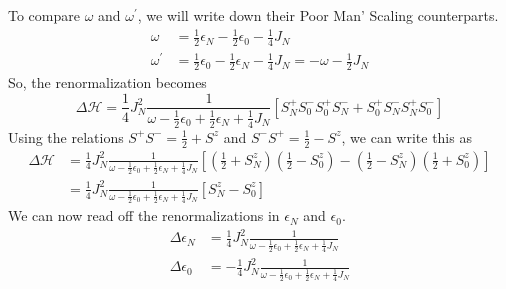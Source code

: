 \documentclass[twoside,11pt]{report}
\numberwithin{equation}{section}
\begin{document}
To compare \(\omega\) and \(\omega^\prime\), we will write down their Poor Man' Scaling counterparts.
\begin{equation}\begin{aligned}
	\omega &= \frac{1}{2}\epsilon_N - \frac{1}{2}\epsilon_0 - \frac{1}{4}J_N\\
	\omega^\prime &= \frac{1}{2}\epsilon_0 - \frac{1}{2}\epsilon_N - \frac{1}{4}J_N = -\omega - \frac{1}{2}J_N
\end{aligned}\end{equation}
So, the renormalization becomes
\begin{equation}
	\Delta \mathcal{H} = \frac{1}{4}J_N^2 \frac{1}{\omega - \frac{1}{2}\epsilon_0 + \frac{1}{2}\epsilon_N + \frac{1}{4}J_N}\left[S_N^+S_0^- S_0^+ S_N^- + S_0^+ S_N^- S_N^+S_0^-\right]
\end{equation}
Using the relations \(S^+ S^- = \frac{1}{2} + S^z\) and \(S^- S^+ = \frac{1}{2} - S^z\), we can write this as
\begin{equation}\begin{aligned}
	\Delta \mathcal{H} &= \frac{1}{4}J_N^2 \frac{1}{\omega - \frac{1}{2}\epsilon_0 + \frac{1}{2}\epsilon_N + \frac{1}{4}J_N}\left[\left(\frac{1}{2} + S_N^z\right)\left(\frac{1}{2} - S_0^z\right) - \left(\frac{1}{2} - S_N^z\right)\left(\frac{1}{2} + S_0^z\right)\right]\\
		    &= \frac{1}{4}J_N^2 \frac{1}{\omega - \frac{1}{2}\epsilon_0 + \frac{1}{2}\epsilon_N + \frac{1}{4}J_N}\left[S_N^z - S_0^z\right]
\end{aligned}\end{equation}
We can now read off the renormalizations in \(\epsilon_N\) and \(\epsilon_0\).
\begin{equation}\begin{aligned}
	\Delta \epsilon_N &= \frac{1}{4}J_N^2 \frac{1}{\omega - \frac{1}{2}\epsilon_0 + \frac{1}{2}\epsilon_N + \frac{1}{4}J_N}\\
	\Delta \epsilon_0 &= -\frac{1}{4}J_N^2 \frac{1}{\omega - \frac{1}{2}\epsilon_0 + \frac{1}{2}\epsilon_N + \frac{1}{4}J_N}
\end{aligned}\end{equation}
\end{document}
